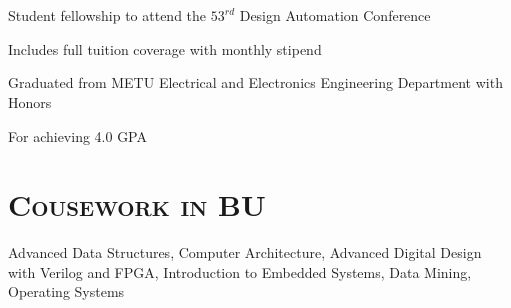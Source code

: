 \begin{resume}
	\begin{formatb}
		\\
		\body\\
	\end{formatb}

  \begin{position}
    Student fellowship to attend the $53^{rd}$ Design Automation Conference
  \end{position}
	
	\begin{position}
		Includes full tuition coverage with monthly stipend
	\end{position}
	
	\begin{position}
		Graduated from METU Electrical and Electronics Engineering Department with
    Honors 
	\end{position}
	
	
	
	\begin{position}
		For achieving 4.0 GPA
	\end{position}
	
	
	
	\section{\textsc{Cousework in BU}}
	
	Advanced Data Structures, Computer Architecture, Advanced Digital Design with
	Verilog and FPGA, Introduction to Embedded Systems, Data Mining, Operating
  Systems 
	

\end{resume}

